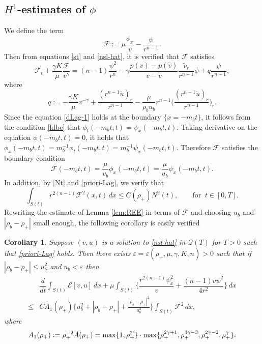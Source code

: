\documentclass[a4paper,12pt,draft]{article}
\newtheorem{corollary}[theorem]{Corollary}
\theoremstyle{remark}
\def\ut{\tilde{u}}
\def\vt{\tilde{v}}
\def\ep{\varepsilon}
\def\mE{\mathcal{E}}
\def\mF{\mathcal{F}}
\def\mQ{\mathcal{Q}}
\begin{document}
\subsection{\texorpdfstring{$H^1$}{H1}-estimates of \texorpdfstring{$\phi$}{phi}}\label{ssec:H1phi}
We define the term
\begin{equation*}
    \mF:= \mu \dfrac{\phi_x}{v} - \frac{\psi}{r^{n-1}}.
\end{equation*}
Then from equations \eqref{st} and \eqref{nsl-hat}, it is verified that $\mF$ satisfies
\begin{equation}\label{HEq}
    \mF_t + \frac{\gamma K}{\mu} \dfrac{\mF}{v^{\gamma}} = (n-1) \frac{\psi^2}{r^n} - \gamma \frac{p(v)-p(\vt)}{v-\vt} \frac{\vt_r}{r^{n-1}} \phi + q \frac{\psi}{r^{n-1}},
\end{equation}
where
\begin{equation*}
	q:= - \frac{\gamma K}{\mu} v^{-\gamma} + \frac{(r^{n-1}\ut)_r}{r^{n-1}}  - \frac{\mu}{\rho_b u_b} r^{n-1} \Big( \frac{(r^{n-1}\ut)_r}{r^{n-1}} \Big)_r.
\end{equation*}
Since the equation \eqref{dLag-1} holds at the boundary $\{x=-m_b t\}$, it follows from the condition \eqref{ldbc} that $\phi_t(-m_b t, t) = \psi_x(-m_b t, t) $. Taking derivative on the equation $\phi(-m_b t,t)=0$, it holds that $ \phi_x(-m_b t, t) = m_b^{-1} \phi_t (-m_b t, t) = m_b^{-1} \psi_x (-m_b t,t)$. Therefore $\mF$ satisfies the boundary condition
\begin{equation}\label{Hbdry}
    \mF(-m_b t, t) = \frac{\mu}{v_b} \phi_x(-m_b t,t) = \frac{\mu}{u_b} \psi_x(-m_bt,t).
\end{equation}
In addition, by \eqref{Nt} and \eqref{priori-Lag}, we verify that
\begin{equation}\label{HN}
    \int_{S(t)} r^{2(n-1)} \mF^2(x,t) \, dx \le C(\rho_{+})N^2(t), \qquad \text{for } \ t\in[0,T].
\end{equation}
Rewriting the estimate of Lemma \ref{lem:REE} in terms of $\mF$ and choosing $u_b$ and $|\rho_b-\rho_+|$ small enough, the following corollary is easily verified
\begin{corollary}\label{corol:REE}
     Suppose $(v,u)$ is a solution to \eqref{nsl-hat} in $\mQ(T)$ for $T>0$ such that \eqref{priori-Lag} holds. Then there exists $\ep=\ep(\rho_+,\mu,\gamma,K,n)>0$ such that if $|\rho_b-\rho_+|\le u_b^2$ and $u_b< \ep$ then
     \begin{align*}
     &\dfrac{d}{d t}\!\int_{S(t)}\!\!\!\! \mE[v,u]\, d x + \mu\!\!\int_{S(t)}\!\! \Big\{ \dfrac{r^{2(n-1)}\psi_x^2}{v} + \dfrac{(n-1)v\psi^2}{4 r^2}   \Big\}\, d x\\ \le& C A_1(\rho_{+}) \Big\{u_b^2+|\rho_b- \rho_+| + \frac{|\rho_b-\rho_{+}|^2}{u_b^2}\Big\} \int_{S(t)} \!\! \mF^2\, d x, 
     \end{align*}
     where
     \begin{equation}
     A_1(\rho_{+}) \vcentcolon= \rho_{+}^{-2}\tilde{A}(\rho_{+}) =\max\{1,\rho_{+}^2\} \cdot \max\{ \rho_+^{2\gamma+1}, \rho_{+}^{4\gamma-3}, \rho_{+}^{2\gamma-2}, \rho_{+}^{\gamma} \}. \label{A1}
     \end{equation}
\end{corollary}
\end{document}
